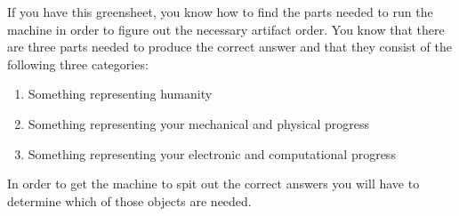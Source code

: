 \documentclass[green]{guildcamp3}
\begin{document}
\name{\gAddPartsTech{}}

If you have this greensheet, you know how to find the parts needed to run the machine in order to figure out the necessary artifact order. You know that there are three parts needed to produce the correct answer and that they consist of the following three categories:

\begin{enumerate}
	\item Something representing humanity
	\item Something representing your mechanical and physical progress
	\item Something representing your electronic and computational progress
\end{enumerate}

In order to get the machine to spit out the correct answers you will have to determine which of those objects are needed. 

\end{document}
